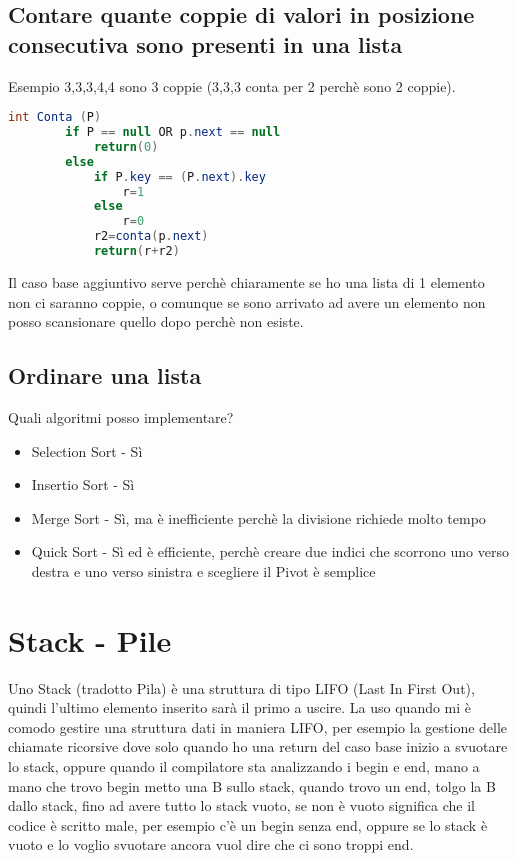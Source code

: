 \subsection{Contare quante coppie di valori in posizione consecutiva sono presenti in una lista}
Esempio 3,3,3,4,4 sono 3 coppie (3,3,3 conta per 2 perchè sono 2 coppie).
\begin{lstlisting}[language=Java]
    int Conta (P)
        if P == null OR p.next == null
            return(0)
        else
            if P.key == (P.next).key
                r=1
            else
                r=0
            r2=conta(p.next)
            return(r+r2)
\end{lstlisting}
Il caso base aggiuntivo serve perchè chiaramente se ho una lista di 1 elemento
non ci saranno coppie, o comunque se sono arrivato ad avere un elemento non posso
scansionare quello dopo perchè non esiste.
\subsection{Ordinare una lista}
Quali algoritmi posso implementare?
\begin{itemize}
    \item Selection Sort - Sì
    \item Insertio Sort - Sì
    \item Merge Sort - Sì, ma è inefficiente perchè la divisione richiede molto tempo
    \item Quick Sort - Sì ed è efficiente, perchè creare due indici che scorrono uno verso destra
    e uno verso sinistra e scegliere il Pivot è semplice
\end{itemize}
\section{Stack - Pile}
Uno Stack (tradotto Pila) è una struttura di tipo LIFO (Last In First Out), quindi
l'ultimo elemento inserito sarà il primo a uscire. La uso quando mi è comodo gestire 
una struttura dati in maniera LIFO, per esempio la gestione delle chiamate ricorsive dove solo quando
ho una return del caso base inizio a svuotare lo stack, oppure quando il compilatore sta analizzando i begin e
end, mano a mano che trovo begin metto una B sullo stack, quando trovo un end, tolgo la B dallo stack, fino
ad avere tutto lo stack vuoto, se non è vuoto significa che il codice è scritto male, per esempio c'è un
begin senza end, oppure se lo stack è vuoto e lo voglio svuotare ancora vuol dire che ci sono troppi end.
